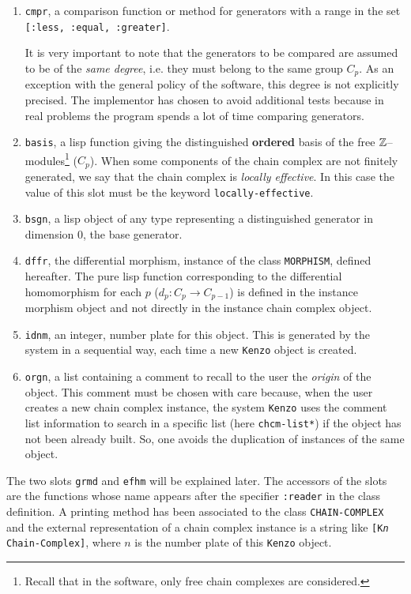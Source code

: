 \begin{enumerate}
\item {\tt cmpr}, a comparison function or method for  generators with a range in the set
{\tt [:less, :equal, :greater]}.
\par
It is very important to note that the generators to be compared are assumed to be
of the {\em same degree}, i.e. they must belong to the same group $C_p$. As an exception with
the general policy of the software, this degree is not explicitly precised. 
The implementor has chosen to avoid additional tests because in real problems the program spends
a lot of time comparing generators.
\item {\tt basis}, a lisp function giving the distinguished {\bf ordered} basis of the free ${\Bbb Z}$--modules\footnote{
Recall that in the software, only free chain complexes are considered.} ($C_p$).  When
some  components of the chain complex  are not finitely generated, we say that the chain complex
is {\em locally effective}. In this case the value of this slot must be the keyword
{\tt locally-effective}.
\item {\tt bsgn}, a lisp object of any type representing a distinguished generator in dimension $0$, the
base generator. 
\item {\tt dffr}, the differential morphism, instance of the class {\tt MORPHISM}, defined hereafter.
The pure lisp function corresponding to the differential homomorphism 
for each $p$ ($d_p : C_p \rightarrow C_{p-1}$) is defined in the instance morphism  object and
not directly in the instance chain complex object.
\item {\tt idnm}, an integer, number plate for this object. This is generated by
the system in a sequential way, each time a new {\tt Kenzo} object is created.
\item {\tt orgn}, a list containing a comment to recall to the user the {\em origin} of
the object. This comment must be chosen with care because, when the user creates a new chain complex instance,
the  system {\tt Kenzo} uses the comment list information to search
in a specific list (here {\tt *chcm-list*}) if the object has not been already built. So, one avoids
the  duplication of instances of the same object. 
\end{enumerate}
The two slots {\tt grmd} and {\tt efhm} will be explained later.
The accessors of the slots are the functions whose name appears after the specifier {\tt:reader} in
the class definition. A printing method has been associated to the class {\tt CHAIN-COMPLEX} 
and the external representation of a chain complex instance is a string like {\tt [K{\em n} Chain-Complex]}, 
where $n$ is the number plate of this {\tt Kenzo} object.

